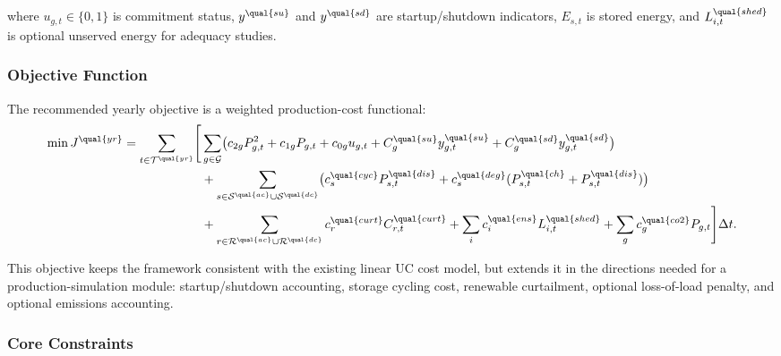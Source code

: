 where \(u_{g,t}\in\{0,1\}\) is commitment status, \(y^{\qual{su}}\) and
\(y^{\qual{sd}}\) are startup/shutdown indicators, \(E_{s,t}\) is stored energy,
and \(L_{i,t}^{\qual{shed}}\) is optional unserved energy for adequacy studies.

\subsubsection{Objective Function}

The recommended yearly objective is a weighted production-cost functional:
\begin{align}
\min J^{\qual{yr}} = \sum_{t\in\mathcal{T}^{\qual{yr}}} \Biggl[
&\sum_{g\in\mathcal{G}}
\bigl(c_{2g}P_{g,t}^2 + c_{1g}P_{g,t} + c_{0g}u_{g,t}
+ C_g^{\qual{su}} y_{g,t}^{\qual{su}} + C_g^{\qual{sd}} y_{g,t}^{\qual{sd}}\bigr) \\
&+ \sum_{s\in\mathcal{S}^{\qual{ac}}\cup\mathcal{S}^{\qual{dc}}}
\bigl(c_s^{\qual{cyc}} P_{s,t}^{\qual{dis}} + c_s^{\qual{deg}}(P_{s,t}^{\qual{ch}} + P_{s,t}^{\qual{dis}})\bigr) \\
&+ \sum_{r\in\mathcal{R}^{\qual{ac}}\cup\mathcal{R}^{\qual{dc}}}
c_r^{\qual{curt}} C_{r,t}^{\qual{curt}}
+ \sum_i c_i^{\qual{ens}} L_{i,t}^{\qual{shed}}
+ \sum_g c_g^{\qual{co2}} P_{g,t}
\Biggr] \Delta t.
\label{eq:annual-prod-obj}
\end{align}

This objective keeps the framework consistent with the existing linear UC cost
model, but extends it in the directions needed for a production-simulation
module: startup/shutdown accounting, storage cycling cost, renewable
curtailment, optional loss-of-load penalty, and optional emissions accounting.

\subsubsection{Core Constraints}

